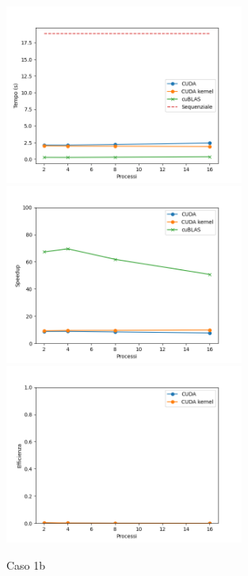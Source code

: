 \begin{figure}[h]
    \centering
    \includegraphics[width=0.7\textwidth]{./imgs/graphs/caso_a1.png}
    \includegraphics[width=0.7\textwidth]{./imgs/graphs/caso_a1_speedup.png}
    \includegraphics[width=0.7\textwidth]{./imgs/graphs/caso_a1_efficiency.png}
    \caption{Caso 1b}
\end{figure}

